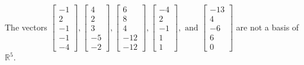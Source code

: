 \begin{exercise}
\begin{exerciseStatement}
  \end{exerciseStatement}
  \begin{exerciseAnswer}
   The vectors \(\left[\begin{array}{r}
-1 \\
2 \\
-1 \\
-1 \\
-4
\end{array}\right] , \left[\begin{array}{r}
4 \\
2 \\
3 \\
-5 \\
-2
\end{array}\right] , \left[\begin{array}{r}
6 \\
8 \\
4 \\
-12 \\
-12
\end{array}\right] , \left[\begin{array}{r}
-4 \\
2 \\
-1 \\
1 \\
1
\end{array}\right] , \text{ and } \left[\begin{array}{r}
-13 \\
4 \\
-6 \\
6 \\
0
\end{array}\right]\) 
  	 are not  a basis of \(\mathbb{R}^5\).
  


  \end{exerciseAnswer}
\end{exercise}